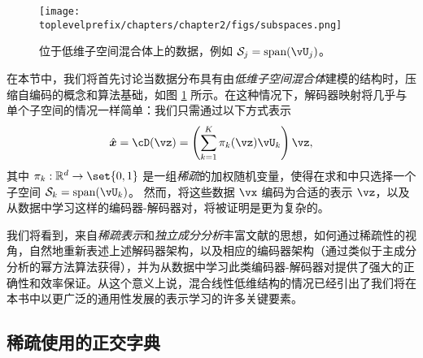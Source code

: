 \documentclass[../../book-main.tex]{subfiles}
\begin{document}
\begin{figure}
    \centering
    \texttt{[image: \\toplevelprefix/chapters/chapter2/figs/subspaces.png]}
    \caption{位于低维子空间混合体上的数据，例如 $\mathcal{S}_j = \mbox{span}(\vU_j)$。}
    \label{fig:subspaces}
\end{figure}

在本节中，我们将首先讨论当数据分布具有由\textit{低维子空间混合体}建模的结构时，压缩自编码的概念和算法基础，如图 \ref{fig:subspaces} 所示。在这种情况下，解码器映射将几乎与单个子空间的情况一样简单：我们只需通过以下方式表示
\begin{equation}\label{eq:mixture-subspaces-decoder-first-cut}
    \hat{\x} = \cD(\vz) = \left( \sum_{k=1}^K \pi_k(\vz)\vU_k \right) \vz,
\end{equation}
其中 $\pi_k : \R^d \to \set{0,1}$ 是一组\textit{稀疏}的加权随机变量，使得在求和中只选择一个子空间 $\mathcal{S}_k = \mbox{span}(\vU_k)$。
然而，将这些数据 $\vx$ 编码为合适的表示 $\vz$，以及从数据中学习这样的编码器-解码器对，将被证明是更为复杂的。

我们将看到，来自\textit{稀疏表示}和\textit{独立成分分析}丰富文献的思想，如何通过稀疏性的视角，自然地重新表述上述解码器架构，以及相应的编码器架构（通过类似于主成分分析的幂方法算法获得），并为从数据中学习此类编码器-解码器对提供了强大的正确性和效率保证。从这个意义上说，混合线性低维结构的情况已经引出了我们将在本书中以更广泛的通用性发展的表示学习的许多关键要素。


\subsection{稀疏使用的正交字典}

\end{document}
